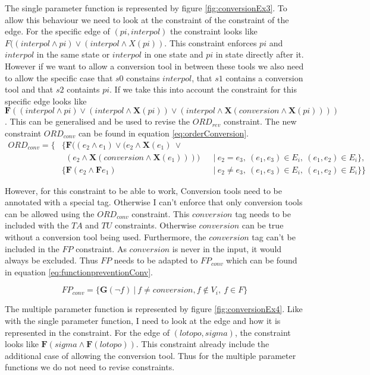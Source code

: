 \documentclass{article}
\begin{document}
The single parameter function is represented by figure \ref{fig:conversionEx3}. To allow this behaviour we need to look at the constraint of the constraint of the edge. For the specific edge of $(pi,interpol)$ the constraint looks like $F((interpol \wedge pi) \vee (interpol \wedge X(pi))$. This constraint enforces $pi$ and $interpol$ in the same state or $interpol$ in one state and $pi$ in state directly after it. However if we want to allow a conversion tool in between these tools we also need to allow the specific case that $s0$ constains $interpol$, that $s1$ contains a conversion tool and that $s2$ containts $pi$. If we take this into account the constraint for this specific edge looks like $\textbf{F}((interpol \wedge pi) \vee (interpol \wedge \textbf{X}(pi)) \vee (interpol \wedge \textbf{X}(conversion \wedge \textbf{X}(pi))))$. This can be generalised and be used to revise the $ORD_{rev}$ constraint. The new constraint $ORD_{conv}$ can be found in equation \ref{eq:orderConversion}.
    \begin{align}
        ORD_{conv} =\{& \{\textbf{F}((e_2 \wedge e_1) \vee (e_2 \wedge \textbf{X} (e_1)\ \vee \nonumber \\ 
        &\ \ (e_2 \wedge \textbf{X}(conversion \wedge \textbf{X}(e_1)))  )&  &|\ e_2 = e_3,\ (e_1,e_3) \in  E_i ,\ (e_1,e_2) \in  E_i \}, \nonumber \\
        &\{\textbf{F}(e_2 \wedge \textbf{F} e_1) &  &|\ e_2 \not= e_3,\ (e_1,e_3) \in  E_i ,\ (e_1,e_2) \in  E_i\}\} \label{eq:orderConversion}
\end{align}
 
 However, for this constraint to be able to work, Conversion tools need to be annotated with a special tag. Otherwise I can't enforce that only conversion tools can be allowed using the $ORD_{conv}$ constraint. This $conversion$ tag needs to be included with the $TA$ and $TU$ constraints. Otherwise $conversion$ can be true without a conversion tool being used. Furthermore, the $conversion$ tag can't be included in the $FP$ constraint. As $conversion$ is never in the input, it would always be excluded. Thus $FP$ needs to be adapted to $FP_{conv}$ which can be found in equation \ref{eq:functionpreventionConv}.
 
 \begin{equation}
         FP_{conv} = \{ \textbf{G}(\neg f)    \ |\ f\not= conversion , f \notin V_i,\ f \in F\} \label{eq:functionpreventionConv}
 \end{equation}
 
 The multiple parameter function is represented by figure \ref{fig:conversionEx4}. Like with the single parameter function, I need to look at the edge and how it is represented in the constraint. For the edge of $(lotopo,sigma)$, the constraint looks like $\textbf{F}(sigma \wedge \textbf{F}(lotopo))$. This constraint already include the additional case of allowing the conversion tool. Thus for the multiple parameter functions we do not need to revise constraints. 
 
\end{document}
